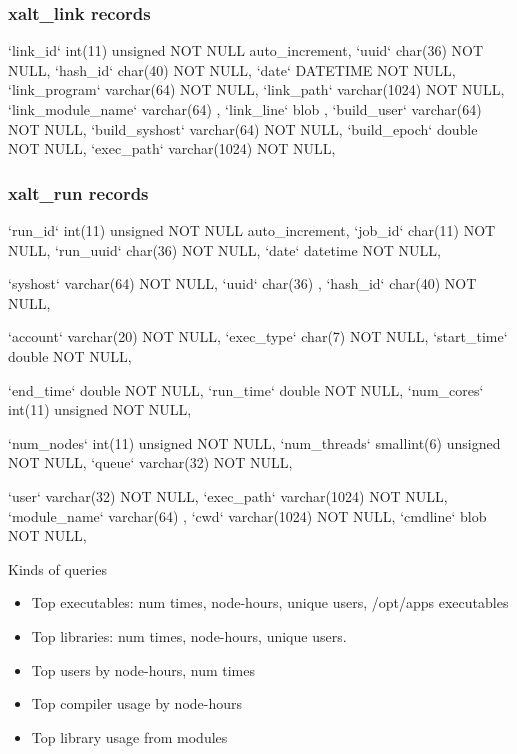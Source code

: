 \documentclass{beamer}
\begin{document}
\begin{frame}[fragile]
    \frametitle{xalt\_link records}
    {\tiny
\begin{semiverbatim}
  `link\_id`          int(11)   unsigned NOT NULL auto\_increment,
  `uuid`             char(36)           NOT NULL,
  `hash\_id`          char(40)           NOT NULL,
  `date`             DATETIME           NOT NULL,
  `link\_program`     varchar(64)        NOT NULL,
  `link\_path`        varchar(1024)      NOT NULL,
  `link\_module\_name` varchar(64)                ,
  `link\_line`        blob                       ,
  `build\_user`       varchar(64)        NOT NULL,
  `build\_syshost`    varchar(64)        NOT NULL,
  `build\_epoch`      double             NOT NULL,
  `exec\_path`        varchar(1024)      NOT NULL,
\end{semiverbatim}
    }
\end{frame}

\begin{frame}[fragile]
    \frametitle{xalt\_run records}
    {\tiny
\begin{semiverbatim}
   `run\_id`        int(11)     unsigned NOT NULL auto\_increment,
   `job\_id`        char(11)             NOT NULL,
   `run\_uuid`      char(36)             NOT NULL,
   `date`          datetime             NOT NULL,

   `syshost`       varchar(64)          NOT NULL,
   `uuid`          char(36)                     ,
   `hash\_id`       char(40)             NOT NULL,

   `account`       varchar(20)          NOT NULL,
   `exec\_type`     char(7)              NOT NULL,
   `start\_time`    double               NOT NULL,

   `end\_time`      double               NOT NULL,
   `run\_time`      double               NOT NULL,
   `num\_cores`     int(11)     unsigned NOT NULL,

   `num\_nodes`     int(11)     unsigned NOT NULL,
   `num\_threads`   smallint(6) unsigned NOT NULL,
   `queue`         varchar(32)          NOT NULL,

   `user`          varchar(32)          NOT NULL,
   `exec\_path`     varchar(1024)        NOT NULL,
   `module\_name`   varchar(64)                  ,
   `cwd`           varchar(1024)        NOT NULL,
   `cmdline`       blob                 NOT NULL,
\end{semiverbatim}
    }
\end{frame}

\begin{frame}{Kinds of queries}
  \begin{itemize}
    \item Top executables: num times, node-hours, unique users,
      /opt/apps executables
    \item Top libraries: num times, node-hours, unique users.
    \item Top users by node-hours, num times
    \item Top compiler usage by node-hours
    \item Top library usage from modules
  \end{itemize}
\end{frame}
\end{document}
